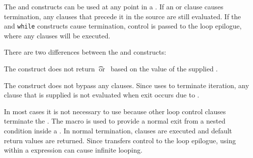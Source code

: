 The  and  constructs can be used
at any point in a .  
If an  or  clause causes
termination, any clauses that precede it in the source
are still evaluated.  
If the  and {\tt while} constructs cause termination,
control is passed to the loop epilogue, where any 
clauses will be executed.  
 
 
 
There are two differences between the  and 
constructs: 
 
\beginlist
\itemitem{\bull} The  construct does not return 
\t\ or \nil\ based on the value of the supplied .
                                                       
\itemitem{\bull} 
The  construct 
does not bypass any  clauses.
Since  uses 
to terminate iteration,
any  clause that is supplied is not evaluated
when exit occurs due to . 
\endlist




In most cases it is not necessary to use 
because other loop control clauses terminate the .  
The macro  is used to provide a normal exit
from a nested condition inside  a .
In normal termination,  clauses are 
executed and default return values are returned.
Since  transfers control to the loop epilogue,
using  within a  expression can cause
infinite looping.
     
